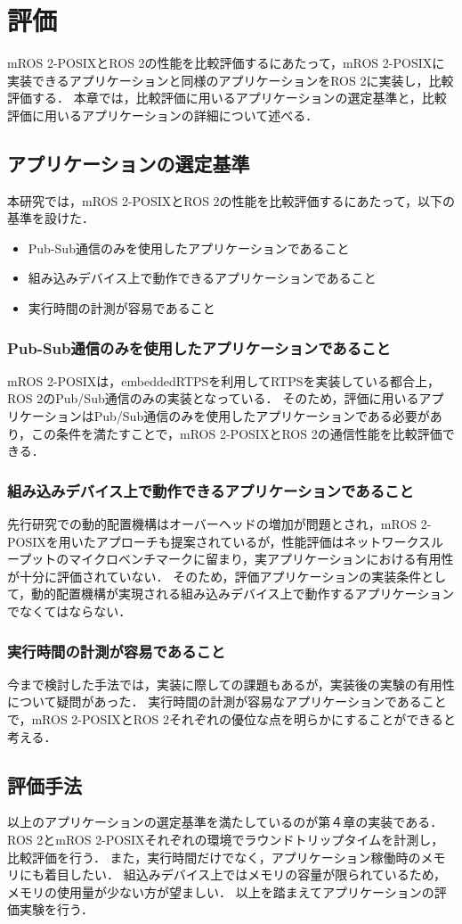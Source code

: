 \chapter{評価}
\label{chap:evaluation}
mROS 2-POSIXとROS 2の性能を比較評価するにあたって，mROS 2-POSIXに実装できるアプリケーションと同様のアプリケーションをROS 2に実装し，比較評価する．
本章では，比較評価に用いるアプリケーションの選定基準と，比較評価に用いるアプリケーションの詳細について述べる．
\section{アプリケーションの選定基準}
本研究では，mROS 2-POSIXとROS 2の性能を比較評価するにあたって，以下の基準を設けた．
\begin{itemize}
    \item Pub-Sub通信のみを使用したアプリケーションであること
    \item 組み込みデバイス上で動作できるアプリケーションであること
    \item 実行時間の計測が容易であること
\end{itemize}
\subsection{Pub-Sub通信のみを使用したアプリケーションであること}
mROS 2-POSIXは，embeddedRTPSを利用してRTPSを実装している都合上，ROS 2のPub/Sub通信のみの実装となっている．
そのため，評価に用いるアプリケーションはPub/Sub通信のみを使用したアプリケーションである必要があり，この条件を満たすことで，mROS 2-POSIXとROS 2の通信性能を比較評価できる．
\subsection{組み込みデバイス上で動作できるアプリケーションであること}
 先行研究での動的配置機構はオーバーヘッドの増加が問題とされ，mROS 2-POSIXを用いたアプローチも提案されているが，性能評価はネットワークスループットのマイクロベンチマークに留まり，実アプリケーションにおける有用性が十分に評価されていない．
 そのため，評価アプリケーションの実装条件として，動的配置機構が実現される組み込みデバイス上で動作するアプリケーションでなくてはならない．
\subsection{実行時間の計測が容易であること}
今まで検討した手法では，実装に際しての課題もあるが，実装後の実験の有用性について疑問があった．
実行時間の計測が容易なアプリケーションであることで，mROS 2-POSIXとROS 2それぞれの優位な点を明らかにすることができると考える．
\section{評価手法}
以上のアプリケーションの選定基準を満たしているのが第４章の実装である．
ROS 2とmROS 2-POSIXそれぞれの環境でラウンドトリップタイムを計測し，比較評価を行う．
また，実行時間だけでなく，アプリケーション稼働時のメモリにも着目したい．
組込みデバイス上ではメモリの容量が限られているため，メモリの使用量が少ない方が望ましい．
以上を踏まえてアプリケーションの評価実験を行う．
